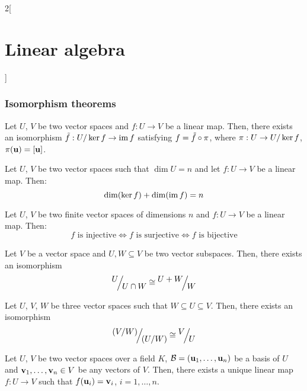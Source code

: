 \documentclass[../../../main.tex]{subfiles}
\begin{document}
\begin{multicols}{2}[\section{Linear algebra}]
  \subsubsection{Isomorphism theorems}
  \begin{theorem}
    Let $U$, $V$ be two vector spaces and $f:U\rightarrow V$ be a linear map. Then, there exists an isomorphism $\Tilde{f}:\quot{U}{\ker f}\rightarrow \im f$ satisfying $f=\Tilde{f}\circ\pi$, where $\pi:U\rightarrow \quot{U}{\ker f}$, $\pi(\boldsymbol{\mathrm{u}})=[\boldsymbol{\mathrm{u}}]$.
    \begin{center}
      \begin{minipage}{\linewidth}
        \centering
        
      \end{minipage}
    \end{center}
  \end{theorem}
  \begin{corollary}
    Let $U$, $V$ be two vector spaces such that $\dim U=n$ and let $f:U\rightarrow V$ be a linear map. Then: $$\dim(\ker f)+\dim(\operatorname{im} f)=n$$
  \end{corollary}
  \begin{corollary}
    Let $U$, $V$ be two finite vector spaces of dimensions $n$ and $f:U\rightarrow V$ be a linear map. Then: $$f\text{ is injective}\iff f\text{ is surjective}\iff f\text{ is bijective}$$
  \end{corollary}
  \begin{theorem}
    Let $V$ be a vector space and $U,W\subseteq V$ be two vector subspaces. Then, there exists an isomorphism $$\quot{U}{U\cap W}\cong\quot{U+W}{W}$$
  \end{theorem}
  \begin{theorem}
    Let $U$, $V$, $W$ be three vector spaces such that $W\subseteq U\subseteq V$. Then, there exists an isomorphism $$\quot{{(\textstyle\quot{V}{W})}}{{(\textstyle\quot{U}{W})}}\cong\quot{V}{U}$$
  \end{theorem}
  \begin{theorem}
    Let $U$, $V$ be two vector spaces over a field $K$, $\mathcal{B}=(\boldsymbol{\mathrm{u}}_1,\ldots,\boldsymbol{\mathrm{u}}_n)$ be a basis of $U$ and $\boldsymbol{\mathrm{v}}_1,\ldots,\boldsymbol{\mathrm{v}}_n\in V$ be any vectors of $V$. Then, there exists a unique linear map $f:U\rightarrow V$ such that $f(\boldsymbol{\mathrm{u}}_i)=\boldsymbol{\mathrm{v}}_i$, $i=1,\ldots,n$.
  \end{theorem}

\end{multicols}
\end{document}
